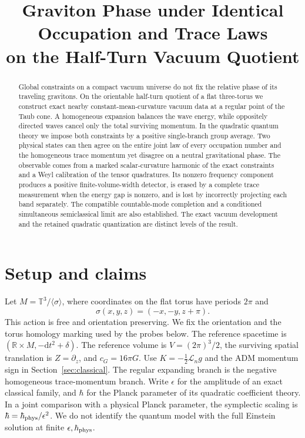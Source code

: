 \documentclass[11pt]{article}
\title{Graviton Phase under Identical Occupation and Trace Laws\\on the Half-Turn Vacuum Quotient}
\author{}
\date{}
\theoremstyle{remark}
\newcommand{\dd}{\mathrm d}
\newcommand{\Lie}{\mathcal L}
\newcommand{\hc}{\hbar}
\newcommand{\cG}{c_G}
\newcommand{\RR}{\mathbb R}
\begin{document}
\maketitle
\begin{abstract}
Global constraints on a compact vacuum universe do not fix the relative phase of its traveling gravitons. On the orientable half-turn quotient of a flat three-torus we construct exact nearby constant-mean-curvature vacuum data at a regular point of the Taub cone. A homogeneous expansion balances the wave energy, while oppositely directed waves cancel only the total surviving momentum. In the quadratic quantum theory we impose both constraints by a positive single-branch group average. Two physical states can then agree on the entire joint law of every occupation number and the homogeneous trace momentum yet disagree on a neutral gravitational phase. The observable comes from a marked scalar-curvature harmonic of the exact constraints and a Weyl calibration of the tensor quadratures. Its nonzero frequency component produces a positive finite-volume-width detector, is erased by a complete trace measurement when the energy gap is nonzero, and is lost by incorrectly projecting each band separately. The compatible countable-mode completion and a conditioned simultaneous semiclassical limit are also established. The exact vacuum development and the retained quadratic quantization are distinct levels of the result.
\end{abstract}

\section{Setup and claims}

Let \(M=\mathbb{T}^{3}/\langle \sigma\rangle\), where coordinates on the flat torus have periods \(2\pi\) and
\[
          \sigma(x,y,z)=(-x,-y,z+\pi).
\]
This action is free and orientation preserving. We fix the orientation and the torus homology marking used by the probes below. The reference spacetime is \((\RR\times M,-\dd t^2+\delta)\). The reference volume is \(V=(2\pi)^3/2\), the surviving spatial translation is \(Z=\partial_z\), and \(\cG=16\pi G\). Use \(K=-\tfrac12\Lie_n g\) and the ADM momentum sign in Section~\ref{sec:classical}. The regular expanding branch is the negative homogeneous trace-momentum branch. Write \(\epsilon\) for the amplitude of an exact classical family, and \(\hc\) for the Planck parameter of its quadratic coefficient theory. In a joint comparison with a physical Planck parameter, the symplectic scaling is \(\hc=\hbar_{\rm phys}/\epsilon^2\). We do not identify the quantum model with the full Einstein solution at finite \(\epsilon,\hbar_{\rm phys}\).
\end{document}
